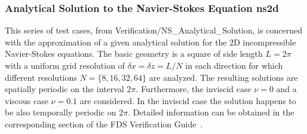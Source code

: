 \subsubsection{Analytical Solution to the Navier-Stokes Equation {\ct ns2d}}

This series of test cases, from Verification/NS\_Analytical\_Solution, is concerned with the approximation of a given analytical solution for the 2D incompressible Navier-Stokes equations. 
%
The basic geometry is a square of side length $L=2\pi$ with a uniform grid resolution of $\delta x = \delta z = L/N$ in each direction for which different resolutions $N =\{8,16,32,64\}$ are analyzed.  The resulting solutions are spatially periodic on the interval $2\pi$. Furthermore, the inviscid case $\nu=0$ and a viscous case $\nu=0.1$ are considered. In the inviscid case the solution happens to be also temporally periodic on $2\pi$.
Detailed information can be obtained in the corresponding section of the FDS Verification Guide~\cite{McGrattan:2018:VG}.

